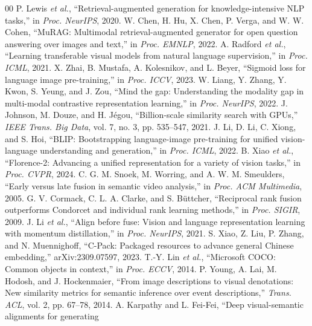 \documentclass[conference]{IEEEtran}
\begin{document}
\begin{thebibliography}{00}
 P. Lewis \emph{et al.}, ``Retrieval-augmented generation for knowledge-intensive NLP
tasks,'' in \emph{Proc. NeurIPS}, 2020.
 W. Chen, H. Hu, X. Chen, P. Verga, and W. W. Cohen, ``MuRAG: Multimodal
retrieval-augmented generator for open question answering over images and text,'' in \emph{Proc. EMNLP},
2022.
 A. Radford \emph{et al.}, ``Learning transferable visual models from natural
language supervision,'' in \emph{Proc. ICML}, 2021.
 X. Zhai, B. Mustafa, A. Kolesnikov, and L. Beyer, ``Sigmoid loss for language
image pre-training,'' in \emph{Proc. ICCV}, 2023.
 W. Liang, Y. Zhang, Y. Kwon, S. Yeung, and J. Zou, ``Mind the gap: Understanding the
modality gap in multi-modal contrastive representation learning,'' in \emph{Proc. NeurIPS}, 2022.
 J. Johnson, M. Douze, and H. J\'egou, ``Billion-scale similarity search with
GPUs,'' \emph{IEEE Trans. Big Data}, vol. 7, no. 3, pp. 535--547, 2021.
 J. Li, D. Li, C. Xiong, and S. Hoi, ``BLIP: Bootstrapping language-image pre-training
for unified vision-language understanding and generation,'' in \emph{Proc. ICML}, 2022.
 B. Xiao \emph{et al.}, ``Florence-2: Advancing a unified representation for a
variety of vision tasks,'' in \emph{Proc. CVPR}, 2024.
 C. G. M. Snoek, M. Worring, and A. W. M. Smeulders, ``Early versus late fusion in
semantic video analysis,'' in \emph{Proc. ACM Multimedia}, 2005.
 G. V. Cormack, C. L. A. Clarke, and S. B\"uttcher, ``Reciprocal rank fusion
outperforms Condorcet and individual rank learning methods,'' in \emph{Proc. SIGIR}, 2009.
 J. Li \emph{et al.}, ``Align before fuse: Vision and language representation learning
with momentum distillation,'' in \emph{Proc. NeurIPS}, 2021.
 S. Xiao, Z. Liu, P. Zhang, and N. Muennighoff, ``C-Pack: Packaged resources to advance
general Chinese embedding,'' arXiv:2309.07597, 2023.
 T.-Y. Lin \emph{et al.}, ``Microsoft COCO: Common objects in context,'' in
\emph{Proc. ECCV}, 2014.
 P. Young, A. Lai, M. Hodosh, and J. Hockenmaier, ``From image descriptions to
visual denotations: New similarity metrics for semantic inference over event descriptions,''
\emph{Trans. ACL}, vol. 2, pp. 67--78, 2014.
 A. Karpathy and L. Fei-Fei, ``Deep visual-semantic alignments for generating

\end{thebibliography}
\end{document}
